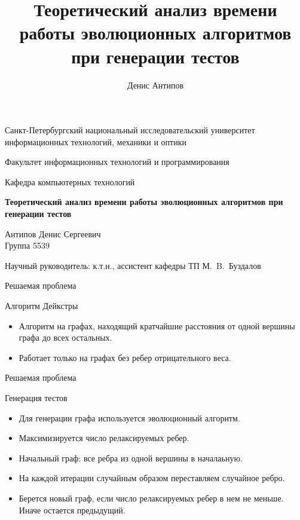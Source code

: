 \documentclass{beamer}
\title[Генерация тестов]{Теоретический анализ времени работы эволюционных алгоритмов при генерации тестов}
\author[Денис Антипов]{Денис Антипов}
\institute[Университет ИТМО]{Национальный исследовательский университет информационных технологий, механики и оптики}
\date{}
\begin{document}
\begin{frame}
\begin{center}
{\scriptsize Санкт-Петербургский национальный исследовательский университет \\ информационных технологий, механики и оптики}

\vspace{1cm}

{\scriptsize Факультет информационных технологий и программирования

Кафедра компьютерных технологий}

\vspace{1cm}

\vbox{\large\bfseries
Теоретический анализ времени работы эволюционных алгоритмов при генерации тестов
}

\vspace{1cm}

{\large Антипов Денис Сергеевич \\}
{\large Группа 5539}


\vspace{1cm}

{\large Научный руководитель: к.т.н., ассистент кафедры ТП М.~B.~Буздалов}


\end{center}
\end{frame}


\begin{frame}{Решаемая проблема}
\begin{block}{Алгоритм Дейкстры}
\begin{itemize}
\item Алгоритм на графах, находящий кратчайшие расстояния от одной вершины графа до всех остальных.
\item Работает только на графах без ребер отрицательного веса.
\end{itemize}
\end{block}
\end{frame}

\begin{frame}{Решаемая проблема}
\begin{block}{Генерация тестов}
\begin{itemize}
\item Для генерации графа используется эволюционный алгоритм.
\item Максимизируется число релаксируемых ребер.
\item Начальный граф: все ребра из одной вершины в началаьную.
\item На каждой итерации случайным образом переставляем случайное ребро.
\item Берется новый граф, если число релаксируемых ребер в нем не меньше. Иначе остается предыдущий.
\end{itemize}
\end{block}
\end{frame}
\end{document}
